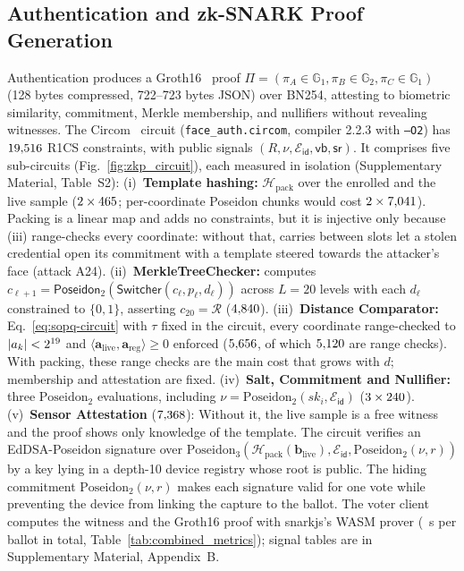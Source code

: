 \documentclass[10pt,letterpaper,journal]{IEEEtran}
\begin{document}
\subsection{Authentication and zk-SNARK Proof Generation}
Authentication produces a Groth16~\cite{Groth2016} proof $\Pi = (\pi_A \in \mathbb{G}_1, \pi_B \in \mathbb{G}_2, \pi_C \in \mathbb{G}_1)$ (128 bytes compressed, 722--723 bytes JSON) over BN254, attesting to biometric similarity, commitment, Merkle membership, and nullifiers without revealing witnesses. The Circom~\cite{Circom2023} circuit (\texttt{face\_auth.circom}, compiler 2.2.3 with \texttt{--O2}) has $19{,}516$ R1CS constraints, with public signals $(R, \nu, \mathcal{E}_{\mathsf{id}}, \mathsf{vb}, \mathsf{sr})$. It comprises five sub-circuits (Fig.~\ref{fig:zkp_circuit}), each measured in isolation (Supplementary Material, Table~S2):
(i)~\textbf{Template hashing:} $\mathcal{H}_{\text{pack}}$ over the enrolled and the live sample ($2 \times 465$; per-coordinate Poseidon chunks would cost $2 \times 7{,}041$). Packing is a linear map and adds no constraints, but it is injective only because (iii) range-checks every coordinate: without that, carries between slots let a stolen credential open its commitment with a template steered towards the attacker's face (attack A24).
(ii)~\textbf{MerkleTreeChecker:} computes $c_{\ell+1} = \mathsf{Poseidon}_2(\mathsf{Switcher}(c_\ell, p_\ell, d_\ell))$ across $L=20$ levels with each $d_\ell$ constrained to $\{0,1\}$, asserting $c_{20} = \mathcal{R}$ ($4{,}840$).
(iii)~\textbf{Distance Comparator:} Eq.~\eqref{eq:sopq-circuit} with $\tau$ fixed in the circuit, every coordinate range-checked to $|a_k| < 2^{19}$ and $\langle \mathbf{a}_{\text{live}}, \mathbf{a}_{\text{reg}} \rangle \geq 0$ enforced ($5{,}656$, of which $5{,}120$ are range checks). With packing, these range checks are the main cost that grows with $d$; membership and attestation are fixed.
(iv)~\textbf{Salt, Commitment and Nullifier:} three $\text{Poseidon}_2$ evaluations, including $\nu = \text{Poseidon}_2(sk_i, \mathcal{E}_{\mathsf{id}})$ ($3 \times 240$).
(v)~\textbf{Sensor Attestation} ($7{,}368$): Without it, the live sample is a free witness and the proof shows only knowledge of the template. The circuit verifies an EdDSA-Poseidon signature over $\text{Poseidon}_3(\mathcal{H}_{\text{pack}}(\mathbf{b}_{\text{live}}), \mathcal{E}_{\mathsf{id}}, \text{Poseidon}_2(\nu, r))$ by a key lying in a depth-10 device registry whose root is public. The hiding commitment $\text{Poseidon}_2(\nu, r)$ makes each signature valid for one vote while preventing the device from linking the capture to the ballot.
The voter client computes the witness and the Groth16 proof with snarkjs's WASM prover (\nClientS~s per ballot in total, Table~\ref{tab:combined_metrics}); signal tables are in Supplementary Material, Appendix~B.
\end{document}
